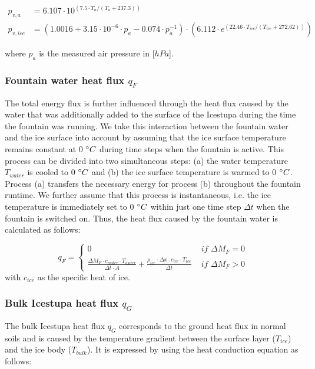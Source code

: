 \documentclass[utf8]{frontiersSCNS} %
\begin{document}
\begin{equation} \begin{split} p_{v,a}&=6.107 \cdot 10^{(7.5 \cdot T_a / (T_a + 237.3))}\\ p_{v,ice}&=(1.0016 +
3.15\cdot10^{-6}\cdot p_{a}-0.074\cdot p_{a}^{-1})\cdot(6.112 \cdot e^{(22.46 \cdot T_{ice} / (T_{ice} + 272.62))})
\end{split} \label{eqn:vp} \end{equation}

where $p_{a}$ is the measured air pressure in [$hPa$].  

\subsubsection{Fountain water heat flux
\texorpdfstring{$q_{F}$}{Lg} }

The total energy flux is further influenced through the heat flux caused by the water that was additionally added to the
surface of the Icestupa during the time the fountain was running. We take this interaction between the fountain water
and the ice surface into account by assuming that the ice surface temperature remains constant at 0 $\degree C$
during time steps when the fountain is active. This process can be divided into two simultaneous steps: (a) the water
temperature $T_{water}$ is cooled to 0 $\degree C$ and (b) the ice surface temperature is warmed to 0 $\degree C$.
Process (a) transfers the necessary energy for process (b) throughout the fountain runtime. We further assume
that this process is instantaneous, i.e. the ice temperature is immediately set to 0 $\degree C$ within just one time
step $\Delta t$ when the fountain is switched on. Thus, the heat flux caused by the fountain water is calculated as
follows:

\begin{equation} 
  q_{F} = \left\{ \begin{array}{ll}
         0 & \textit{ if } \Delta M_{F} = 0\\ \frac{ \Delta M_F \cdot c_{water} \cdot T_{water}}{\Delta t \cdot A} +
         \frac{\rho_{ice} \cdot \Delta x \cdot c_{ice} \cdot T_{ice}}{\Delta t} & \textit{ if } \Delta M_{F} > 0 
    \end{array} \right.  \label{eqn:qF}
\end{equation} 
with $c_{ice}$ as the specific heat of ice. 

\subsubsection{Bulk Icestupa heat flux \texorpdfstring{$q_{G}$}{Lg}} \label{sec:Bulkflux}
The bulk Icestupa heat flux $q_{G}$ corresponds to the ground heat flux in normal soils and is caused by the temperature
gradient between the surface layer ($T_{ice}$) and the ice body ($T_{bulk}$). It is expressed by using the heat
conduction equation as follows:
\end{document}
